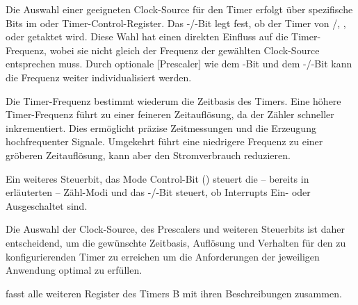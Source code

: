 \newpage
Die Auswahl einer geeigneten \glqq Clock-Source\grqq{} f\"ur den Timer erfolgt \"uber spezifische Bits im  oder  Timer-Control-Register. Das -/-Bit legt fest, ob der Timer von /, ,  oder  getaktet wird. Diese Wahl hat einen direkten Einfluss auf die Timer-Frequenz, wobei sie nicht gleich der Frequenz der gew\"ahlten Clock-Source entsprechen muss. Durch optionale [Prescaler] wie dem -Bit und dem -/-Bit kann die Frequenz weiter individualisiert werden.\\

Die Timer-Frequenz bestimmt wiederum die Zeitbasis des Timers. Eine h\"ohere Timer-Frequenz f\"uhrt zu einer feineren Zeitaufl\"osung, da der Z\"ahler schneller inkrementiert. Dies erm\"oglicht pr\"azise Zeitmessungen und die Erzeugung hochfrequenter Signale. Umgekehrt f\"uhrt eine niedrigere Frequenz zu einer gr\"oberen Zeitaufl\"osung, kann aber den Stromverbrauch reduzieren.

Ein weiteres Steuerbit, das \glqq{}Mode Control\grqq{}-Bit () steuert die -- bereits in  erl\"auterten -- Z\"ahl-Modi und das -/-Bit steuert, ob Interrupts Ein- oder Ausgeschaltet sind.

Die Auswahl der Clock-Source, des Prescalers und weiteren Steuerbits ist daher entscheidend, um die gew\"unschte Zeitbasis, Aufl\"osung und Verhalten f\"ur den zu konfigurierenden Timer zu erreichen um die Anforderungen der jeweiligen Anwendung optimal zu erf\"ullen.

\newpage
{} fasst alle weiteren Register des Timers B mit ihren Beschreibungen zusammen.\AI

